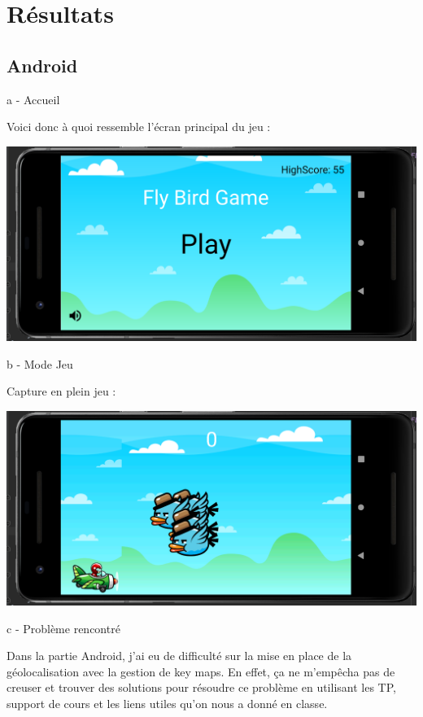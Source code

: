 \documentclass{rapportECL}
\begin{document}
\newpage
\section{Résultats}
\subsection{Android}
a - Accueil

Voici donc à quoi ressemble l'écran principal du jeu : 

\begin{center}
    \includegraphics[scale = 0.5]{logos/Accueil.png}
\end{center}

b - Mode Jeu

Capture en plein jeu : 

\begin{center}
    \includegraphics[scale = 0.5]{logos/ModeGame.png}
\end{center}

c - Problème rencontré

Dans la partie Android, j'ai eu de difficulté sur la mise en place de la géolocalisation avec la gestion de key maps. En effet, ça ne m'empêcha pas de creuser et trouver des solutions pour résoudre ce problème en utilisant les TP, support de cours et les liens utiles\cite{Cours} qu'on nous a donné en classe.
\end{document}
